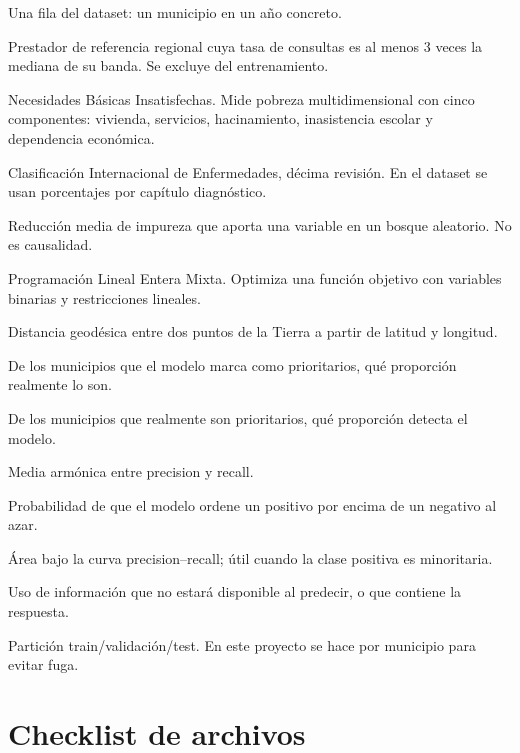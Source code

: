\documentclass[11pt,a4paper]{article}
\begin{document}
\begin{description}[leftmargin=*,style=nextline,itemsep=4pt]
  \item[Municipio--año] Una fila del dataset: un municipio en un año concreto.
  \item[Hub] Prestador de referencia regional cuya tasa de consultas es al menos 3 veces la mediana de su banda. Se excluye del entrenamiento.
  \item[NBI] Necesidades Básicas Insatisfechas. Mide pobreza multidimensional con cinco componentes: vivienda, servicios, hacinamiento, inasistencia escolar y dependencia económica.
  \item[CIE-10] Clasificación Internacional de Enfermedades, décima revisión. En el dataset se usan porcentajes por capítulo diagnóstico.
  \item[Gini importance] Reducción media de impureza que aporta una variable en un bosque aleatorio. No es causalidad.
  \item[MILP] Programación Lineal Entera Mixta. Optimiza una función objetivo con variables binarias y restricciones lineales.
  \item[Haversine] Distancia geodésica entre dos puntos de la Tierra a partir de latitud y longitud.
  \item[Precision] De los municipios que el modelo marca como prioritarios, qué proporción realmente lo son.
  \item[Recall] De los municipios que realmente son prioritarios, qué proporción detecta el modelo.
  \item[F1] Media armónica entre precision y recall.
  \item[ROC-AUC] Probabilidad de que el modelo ordene un positivo por encima de un negativo al azar.
  \item[PR-AUC] Área bajo la curva precision--recall; útil cuando la clase positiva es minoritaria.
  \item[Data leakage] Uso de información que no estará disponible al predecir, o que contiene la respuesta.
  \item[Split] Partición train/validación/test. En este proyecto se hace por municipio para evitar fuga.
\end{description}

\section{Checklist de archivos}
\end{document}
